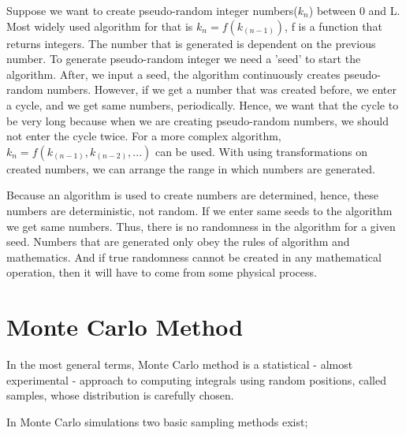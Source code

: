 \documentclass[12pt,fleqn]{report}
\begin{document}
Suppose we want to create pseudo-random integer numbers($k_n$) between 0 and L. Most widely used algorithm for that is $k_n = f(k_{(n-1)})$, f is a function that returns integers. The number that is generated is dependent on the previous number. To generate pseudo-random integer we need a 'seed' to start the algorithm. After, we input a seed, the algorithm continuously creates pseudo-random numbers. However, if we get a number that was created before, we enter a cycle, and we get same numbers, periodically. Hence, we want that the cycle to be very long because when we are creating pseudo-random numbers, we should not enter the cycle twice. For a more complex algorithm, $k_n = f(k_{(n-1)}, k_{(n-2)}, ...)$ can be used. With using transformations on created numbers, we can arrange the range in which numbers are generated.

Because an algorithm is used to create numbers are determined, hence, these numbers are deterministic, not random. If we enter same seeds to the algorithm we get same numbers. Thus, there is no randomness in the algorithm for a given seed. Numbers that are generated only obey the rules of algorithm and mathematics. And if true randomness cannot be created in any mathematical operation, then it will have to come from some physical process. \cite{random}


 \section{Monte Carlo Method}

In the most general terms, Monte Carlo method is a statistical - almost experimental - approach to computing integrals using random positions, called samples, whose distribution is carefully chosen. \cite[p. 1]{krauth}

In Monte Carlo simulations two basic sampling methods exist; 
\end{document}
